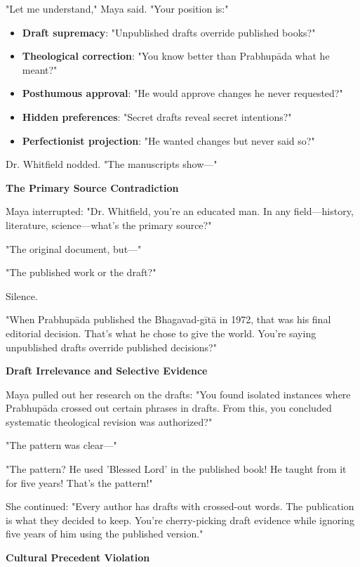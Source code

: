 \documentclass[12pt,twoside]{book}
\begin{document}
"Let me understand," Maya said. "Your position is:"

\begin{itemize}
\item \textbf{\textbf{Draft supremacy}}: "Unpublished drafts override published books?"
\item \textbf{\textbf{Theological correction}}: "You know better than Prabhupāda what he meant?"
\item \textbf{\textbf{Posthumous approval}}: "He would approve changes he never requested?"
\item \textbf{\textbf{Hidden preferences}}: "Secret drafts reveal secret intentions?"
\item \textbf{\textbf{Perfectionist projection}}: "He wanted changes but never said so?"
\end{itemize}

Dr. Whitfield nodded. "The manuscripts show—"

\textbf{\textbf{The Primary Source Contradiction}}

Maya interrupted: "Dr. Whitfield, you're an educated man. In any field—history, literature, science—what's the primary source?"

"The original document, but—"

"The published work or the draft?"

Silence.

"When Prabhupāda published the Bhagavad-gītā in 1972, that was his final editorial decision. That's what he chose to give the world. You're saying unpublished drafts override published decisions?"

\textbf{\textbf{\textbf{Draft Irrelevance and Selective Evidence}}}

Maya pulled out her research on the drafts: "You found isolated instances where Prabhupāda crossed out certain phrases in drafts. From this, you concluded systematic theological revision was authorized?"

"The pattern was clear—"

"The pattern? He used 'Blessed Lord' in the published book! He taught from it for five years! That's the pattern!"

She continued: "Every author has drafts with crossed-out words. The publication is what they decided to keep. You're cherry-picking draft evidence while ignoring five years of him using the published version."

\textbf{\textbf{\textbf{Cultural Precedent Violation}}}
\end{document}
